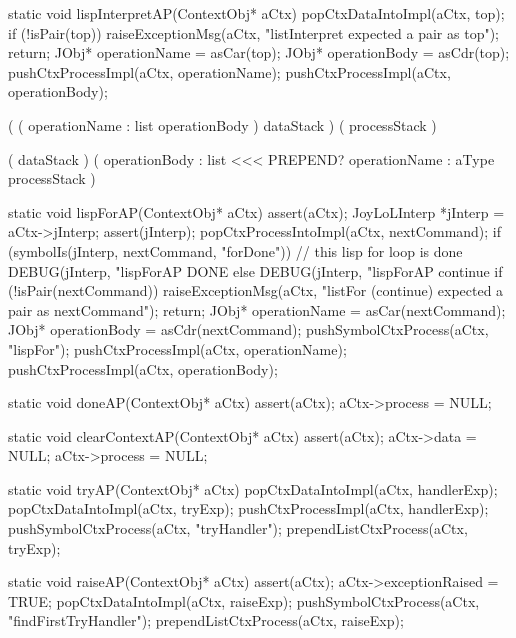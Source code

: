 \stoptyping

\startCCode
static void lispInterpretAP(ContextObj* aCtx) {
  popCtxDataIntoImpl(aCtx, top);
  if (!isPair(top)) {
    raiseExceptionMsg(aCtx,
      "listInterpret expected a pair as top");
    return;
  }
  JObj* operationName = asCar(top);
  JObj* operationBody = asCdr(top);
  pushCtxProcessImpl(aCtx, operationName);
  pushCtxProcessImpl(aCtx, operationBody);
}
\stopCCode

\starttyping

\startWord[lispInterpret]

\preDataStack
  (
    (
      operationName : list
      operationBody
    )
    dataStack 
  )
\preProcessStack
  (
    processStack
  )
\preConditions
\stopPreStack

\postDataStack
  ( dataStack )
\postProcessStack
  (
    operationBody : list <<< PREPEND?
    operationName : aType
    processStack
  )
\postConditions
\stopPostStack

\stopWord

\stoptyping

\startCCode
static void lispForAP(ContextObj* aCtx) {
  assert(aCtx);
  JoyLoLInterp *jInterp = aCtx->jInterp;
  assert(jInterp);
  popCtxProcessIntoImpl(aCtx, nextCommand);
  if (symbolIs(jInterp, nextCommand, "forDone")) {
    // this lisp for loop is done
    DEBUG(jInterp, "lispForAP DONE%
  } else {
    DEBUG(jInterp, "lispForAP continue%
    if (!isPair(nextCommand)) {
      raiseExceptionMsg(aCtx,
        "listFor (continue) expected a pair as nextCommand");
      return;
    }
    JObj* operationName = asCar(nextCommand);
    JObj* operationBody = asCdr(nextCommand);
    pushSymbolCtxProcess(aCtx, "lispFor");
    pushCtxProcessImpl(aCtx, operationName);
    pushCtxProcessImpl(aCtx, operationBody);
  }
}
\stopCCode

\startCCode
static void doneAP(ContextObj* aCtx) {
  assert(aCtx);
  aCtx->process = NULL;
}
\stopCCode

\startCCode
static void clearContextAP(ContextObj* aCtx) {
  assert(aCtx);
  aCtx->data    = NULL;
  aCtx->process = NULL;
}
\stopCCode

\startCCode
static void tryAP(ContextObj* aCtx) {
  popCtxDataIntoImpl(aCtx, handlerExp);
  popCtxDataIntoImpl(aCtx, tryExp);
  pushCtxProcessImpl(aCtx, handlerExp);
  pushSymbolCtxProcess(aCtx, "tryHandler");
  prependListCtxProcess(aCtx, tryExp);
}
\stopCCode

\startCCode
static void raiseAP(ContextObj* aCtx) {
  assert(aCtx);
  aCtx->exceptionRaised = TRUE;
  popCtxDataIntoImpl(aCtx, raiseExp);
  pushSymbolCtxProcess(aCtx, "findFirstTryHandler");
  prependListCtxProcess(aCtx, raiseExp);
}
\stopCCode

